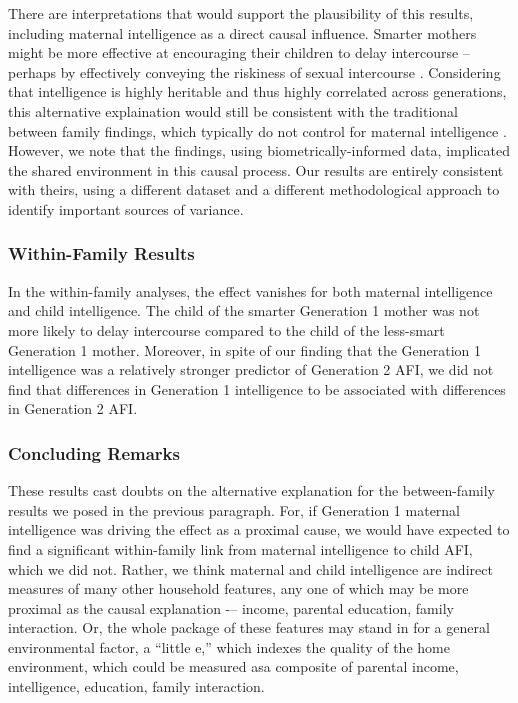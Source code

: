 There are interpretations that would support the plausibility of this results, including maternal intelligence as a direct causal influence. Smarter mothers might be more effective at encouraging their children to delay intercourse -- perhaps by effectively conveying the riskiness of sexual intercourse \citep{hutchinson2003role,mathews2009predictors}. Considering that intelligence is highly heritable \citep{Bouchard2004} and thus highly correlated across generations, this alternative explaination would still be consistent with the traditional between family findings, which typically do not control for maternal intelligence \citep{halpern2000smart,mott1983early,Paul2000,Woodward2001}. However, we note that the \citet{harden2011don} findings, using biometrically-informed data, implicated the shared environment in this causal process. Our results are entirely consistent with theirs, using a different dataset and a different methodological approach to identify important sources of variance.
 
\subsubsection{Within-Family Results} In the within-family analyses, the effect vanishes for both maternal intelligence and child intelligence. The child of the smarter Generation 1 mother was not more likely to delay intercourse compared to the child of the less-smart Generation 1 mother. Moreover, in spite of our finding that the Generation 1 intelligence was a relatively stronger predictor of Generation 2 AFI, we did not find that differences in Generation 1 intelligence to be associated with differences in Generation 2 AFI. 

\subsubsection{Concluding Remarks}These results cast doubts on the alternative explanation for the between-family results we posed in the previous paragraph. For, if Generation 1 maternal intelligence was driving the effect as a proximal cause, we would have expected to find a significant within-family link from maternal intelligence to child AFI, which we did not. Rather, we think maternal and child intelligence are indirect measures of many other household features, any one of which may be more proximal as the causal explanation -– income, parental education, family interaction. Or, the whole package of these features may stand in for a general environmental factor, a ``little e,'' which indexes the quality of the home environment, which could be measured asa composite of parental income, intelligence, education, family interaction.

